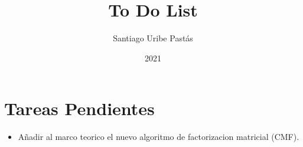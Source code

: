 \documentclass{article}
\title{To Do List}
\author{Santiago Uribe Pastás}
\date{2021}
\begin{document}
\maketitle

\section{Tareas Pendientes}
\begin{itemize}
    \item Añadir al marco teorico el nuevo algoritmo de factorizacion matricial (CMF).
\end{itemize}
\end{document}
